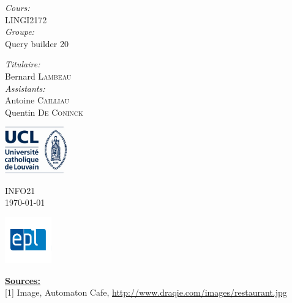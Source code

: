 \documentclass[a4paper,10pt]{article}
\begin{document}
\begin{titlepage}
\begin{minipage}{0.48\textwidth}
\begin{flushleft}
        \textit{Cours:} \\
        LINGI2172 \\ \vspace{0.3cm}
         \textit{Groupe:} \\
         Query builder 20
        

      \end{flushleft}
    \end{minipage}
    \begin{minipage}{0.48\textwidth}
      \begin{flushright} \large
        
       
        \textit{Titulaire:} \\
        Bernard \textsc{Lambeau}\\ \vspace{0.3cm}
        \textit{Assistants:} \\
        Antoine \textsc{Cailliau}\\
        Quentin \textsc{De Coninck}\\
        
      \end{flushright}
    \end{minipage}

    \vfill

    \begin{minipage}{0.3\textwidth}
      \begin{flushleft}
        \includegraphics[height=2cm]{logo_UCL.jpg}
      \end{flushleft}
    \end{minipage}
    \begin{minipage}{0.3\textwidth}
      \begin{center}
        {\large INFO21}\\
        {\large \today}
      \end{center}
    \end{minipage}
    \begin{minipage}{0.3\textwidth}
      \begin{flushright}
        \includegraphics[height=2cm]{logo_EPL.jpg}
      \end{flushright}
    \end{minipage}
\end{titlepage}



\vspace{0.5cm}
\underline{\textbf{Sources:}} \\

[1] Image, Automaton Cafe, \url{http://www.draqie.com/images/restaurant.jpg}
\end{document}

